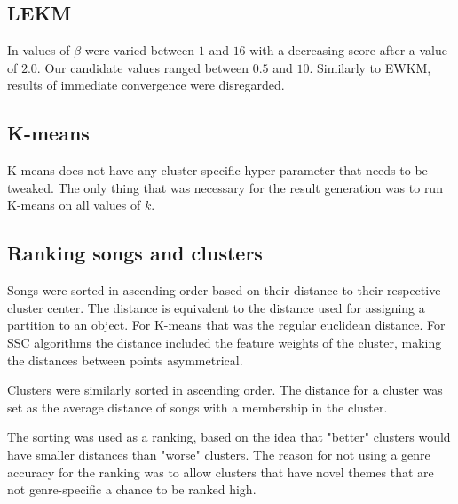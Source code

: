 \documentclass[../report.tex]{subfiles}
\begin{document}
\subsection{LEKM}
In \citeauthor{Gan2016} \cite{Gan2016} values of $\beta$ were varied between $1$ and $16$ with a decreasing score after a value of $2.0$. Our candidate values ranged between $0.5$ and $10$. Similarly to EWKM, results of immediate convergence were disregarded.



\subsection{K-means}
K-means does not have any cluster specific hyper-parameter that needs to be tweaked. The only thing that was necessary for the result generation was to run K-means on all values of $k$.

\subsection{Ranking songs and clusters}
Songs were sorted in ascending order based on their distance to their respective cluster center. The distance is equivalent to the distance used for assigning a partition to an object. For K-means that was the regular euclidean distance. For SSC algorithms the distance included the feature weights of the cluster, making the distances between points asymmetrical.

Clusters were similarly sorted in ascending order. The distance for a cluster was set as the average distance of songs with a membership in the cluster.

The sorting was used as a ranking, based on the idea that "better" clusters would have smaller distances than "worse" clusters. The reason for not using a genre accuracy for the ranking was to allow clusters that have novel themes that are not genre-specific a chance to be ranked high.
\end{document}
